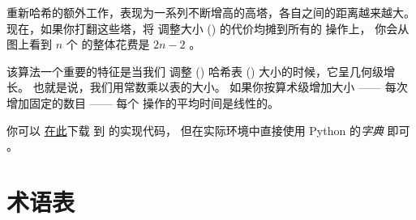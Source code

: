 重新哈希的额外工作，表现为一系列不断增高的高塔，各自之间的距离越来越大。
现在，如果你打翻这些塔，将 调整大小 () 的代价均摊到所有的 操作上， 你会从图上看到 $n$ 个  的整体花费是 $2n - 2$ 。


该算法一个重要的特征是当我们 调整 () 哈希表 ()
大小的时候，它呈几何级增长。  也就是说，我们用常数乘以表的大小。
如果你按算术级增加大小 —— 每次增加固定的数目 —— 每个  操作的平均时间是线性的。


你可以 \href{http://thinkpython2.com/code/Map.py}{在此}下载 到  的实现代码， 但在实际环境中直接使用 Python 的{\em 字典} 即可 。

\section{术语表}

